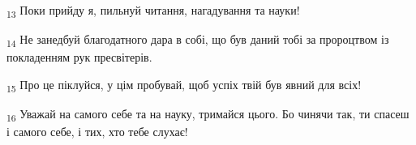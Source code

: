 \begin{tcolorbox}
\textsubscript{13} Поки прийду я, пильнуй читання, нагадування та науки!
\end{tcolorbox}
\begin{tcolorbox}
\textsubscript{14} Не занедбуй благодатного дара в собі, що був даний тобі за пророцтвом із покладенням рук пресвітерів.
\end{tcolorbox}
\begin{tcolorbox}
\textsubscript{15} Про це піклуйся, у цім пробувай, щоб успіх твій був явний для всіх!
\end{tcolorbox}
\begin{tcolorbox}
\textsubscript{16} Уважай на самого себе та на науку, тримайся цього. Бо чинячи так, ти спасеш і самого себе, і тих, хто тебе слухає!
\end{tcolorbox}
